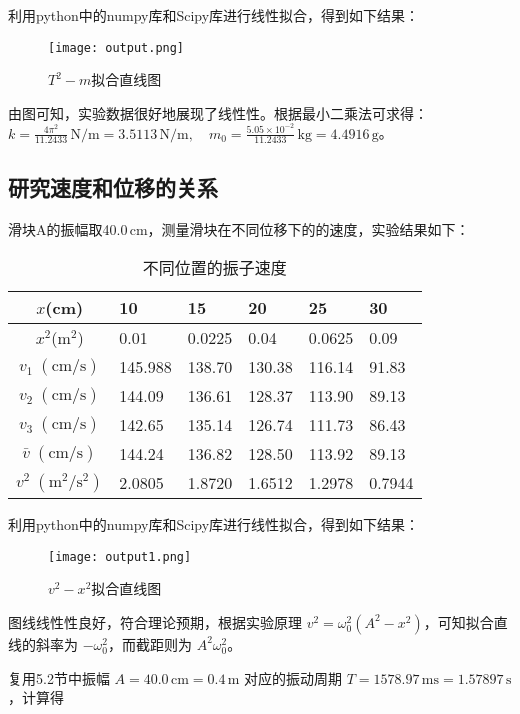 \documentclass[UTF-8,twoside,cs4size]{ctexart}
\begin{document}
利用python中的numpy库和Scipy库进行线性拟合，得到如下结果：
\newpage
\begin{figure}[!h]
    \centering
    \texttt{[image: output.png]}
    \caption{$T^2 - m$拟合直线图}
\end{figure}
由图可知，实验数据很好地展现了线性性。根据最小二乘法可求得：
\(k=\frac{4\pi^2}{11.2433}\,\mathrm{N/m}=3.5113\,\mathrm{N/m},\quad m_0=\frac{5.05\times10^{-2}}{11.2433}\,\mathrm{kg}=4.4916\,\mathrm{g}\)。

\subsection{研究速度和位移的关系}
滑块A的振幅取40.0\,cm，测量滑块在不同位移下的的速度，实验结果如下：
\begin{table}[!h]
    \centering		
    \renewcommand\arraystretch{1.5}
    \begin{tabularx}{\textwidth}{|c|Y|Y|Y|Y|Y|}
        \hline
        $ x $\;(cm)&10&15&20&25&30\\
        \hline
        $ x^2 $\;(m$ ^2 $)&0.01&0.0225&0.04&0.0625&0.09\\
        \hline
        $ v_1\;(\mathrm{cm/s}) $&145.988&138.70&130.38&116.14&91.83\\
        \hline
        $ v_2\;(\mathrm{cm/s}) $&144.09&136.61&128.37&113.90&89.13\\
        \hline
        $ v_3\;(\mathrm{cm/s}) $&142.65&135.14&126.74&111.73&86.43\\
        \hline
        $ \bar v\;(\mathrm{cm/s}) $&144.24&136.82&128.50&113.92&89.13\\
        \hline
        $ v^2\;(\mathrm{m^2/s^2}) $&2.0805&1.8720&1.6512&1.2978&0.7944\\
        \hline
    \end{tabularx}
    \caption{不同位置的振子速度}
\end{table}

利用python中的numpy库和Scipy库进行线性拟合，得到如下结果：
\newpage
\begin{figure}[!h]
    \centering
    \texttt{[image: output1.png]}
    \caption{$v^2 - x^2$拟合直线图}
\end{figure}
图线线性性良好，符合理论预期，根据实验原理 $v^2 = \omega_0^2(A^2 - x^2)$，可知拟合直线的斜率为 $-\omega_0^2$，而截距则为 $A^2\omega_0^2$。

复用5.2节中振幅 $A = 40.0\,\mathrm{cm} = 0.4\,\mathrm{m}$ 对应的振动周期 $T = 1578.97\,\mathrm{ms} = 1.57897\,\mathrm{s}$，计算得
\end{document}
